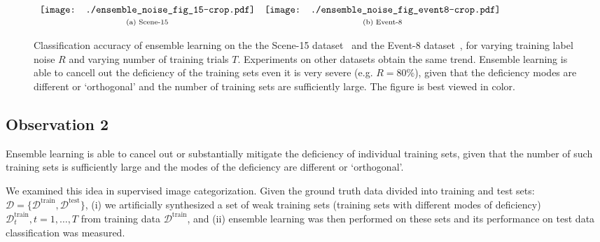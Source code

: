 \documentclass[preprint,12pt,3p]{elsarticle}
\begin{document}
\begin{figure*}[ht]
  \centering
$  \begin{array}{cccc}
 \texttt{[image: ./ensemble\_noise\_fig\_15-crop.pdf]} & 
  \texttt{[image: ./ensemble\_noise\_fig\_event8-crop.pdf]}  \\
\scriptsize{\text{(a) Scene-15}}  & \scriptsize{\text{(b) Event-8}}
  \end{array}  $
  \caption{Classification accuracy of ensemble learning on the the
    Scene-15 dataset~\citep{lazebnik:cvpr06} and the Event-8
    dataset~\citep{event-8}, for varying training label noise $R$ and
    varying number of training trials $T$. Experiments on other
    datasets obtain the same trend. Ensemble learning is able to
    cancell out the deficiency of the training sets even it is very
    severe (e.g. $R=80\%$), given that the deficiency modes are
    different or `orthogonal' and the number of training sets are
    sufficiently large. The figure is best viewed in color.}
\label{fig:mov2}
\end{figure*}


\subsection{Observation 2}
\label{sec:mov2}
Ensemble learning is able to cancel out or  substantially mitigate the
deficiency of individual training sets, given that the number of such
training sets is sufficiently large and the modes of the deficiency
are different or `orthogonal'. 

We examined this idea in supervised
image categorization.  Given the ground truth data divided into training
and test sets: $\mathcal D = \{\mathcal{D}^\text{train} ,
\mathcal{D}^\text{test}\}$, (i) we artificially synthesized a set of
weak training sets (training sets with different modes of deficiency)
$\mathcal{D}^\text{train}_t, t=1,\ldots,T$ from training data
$\mathcal{D}^\text{train}$, and (ii) ensemble learning was then
performed on these sets and its performance on test data
classification was measured.
\end{document}
